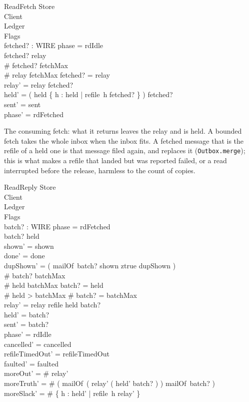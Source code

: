 \documentclass[a4paper,10pt,fleqn]{article}
\begin{document}
\begin{schema}{ReadFetch}
  \Delta Store \\
  \Xi Client \\
  \Xi Ledger \\
  \Xi Flags \\
  fetched? : \power WIRE
  \where
  phase = rdIdle \\
  fetched? \subseteq relay \\
  \# fetched? \leq fetchMax \\
  \# relay \leq fetchMax \implies fetched? = relay \\
  relay' = relay \setminus fetched? \\
  held' = ( held \setminus \{ h : held | refile~h \in fetched? \} ) \cup fetched? \\
  sent' = sent \\
  phase' = rdFetched
\end{schema}

The consuming fetch: what it returns leaves the relay and is held.  A
bounded fetch takes the whole inbox when the inbox fits.  A fetched message
that is the refile of a held one is that message filed again, and replaces
it (\texttt{Outbox.merge}); this is what makes a refile that landed but was
reported failed, or a read interrupted before the release, harmless to the
count of copies.

\begin{schema}{ReadReply}
  \Delta Store \\
  \Delta Client \\
  \Xi Ledger \\
  \Delta Flags \\
  batch? : \power WIRE
  \where
  phase = rdFetched \\
  batch? \subseteq held \\
  shown' = shown \\
  done' = done \\
  dupShown' = ( \IF mailOf~batch? \cap shown \neq \emptyset \THEN ztrue \ELSE dupShown ) \\
  \# batch? \leq batchMax \\
  \# held \leq batchMax \implies batch? = held \\
  \# held > batchMax \implies \# batch? = batchMax \\
  relay' = relay \cup refile \limg held \setminus batch? \rimg \\
  held' = batch? \\
  sent' = batch? \\
  phase' = rdIdle \\
  cancelled' = cancelled \\
  refileTimedOut' = refileTimedOut \\
  faulted' = faulted \\
  moreOut' = \# relay' \\
  moreTruth' = \# ( mailOf~( relay' \cup ( held' \setminus batch? ) ) \setminus
    mailOf~batch? ) \\
  moreSlack' = \# \{ h : held' | refile~h \in relay' \}
\end{schema}
\end{document}
